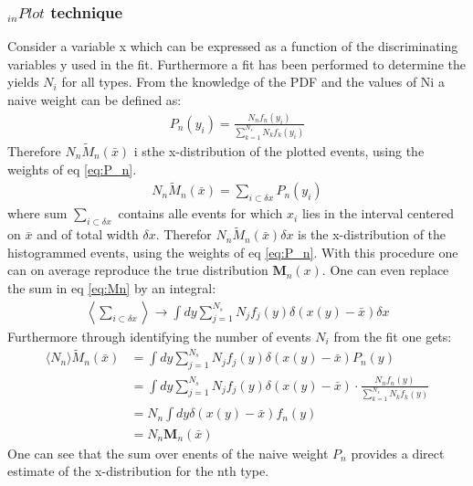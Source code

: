 \documentclass[english]{uzhpub}
\begin{document}
 \subsubsection{$_{in} Plot$ technique}
Consider a variable x which can be expressed as a function of the discriminating variables y used in the fit. Furthermore a fit has been performed to determine the yields $N_i$ for all types. From the knowledge of the PDF and the values of Ni a naive weight can be defined as:
 \begin{align}
  P_n(y_i) = \frac{N_n f_n(y_i)}{\sum_{k=1}^{N_s} N_k f_k(y_i)} \label{eq:P_n}
 \end{align}
 Therefore $N_n \tilde{M}_n (\bar{x})$ i sthe x-distribution of the plotted events, using the weights of eq \ref{eq:P_n}.
 \begin{align}
  N_n \tilde{M}_n (\bar{x}) = \sum_{i \subset \delta x} P_n (y_i) \label{eq:Mn}
 \end{align}
 where sum $\sum_{i \subset \delta x}$ contains alle events for which $x_i$ lies in the interval centered on $\bar{x}$ and of total width $\delta x$.
 Therefor $N_n \tilde{M}_n (\bar{x}) \delta x$ is the x-distribution of the histogrammed events, using the weights of eq \ref{eq:P_n}.
 With this procedure one can on average reproduce the true distribution $\textbf{M}_n(x)$. One can even replace the sum in eq \ref{eq:Mn} by an integral:
 \begin{align}
  \left \langle \sum_{i \subset \delta x} \right \rangle \rightarrow \int dy \sum_{j=1}^{N_s} N_j f_j (y) \delta (x(y) - \bar{x}) \delta x \label{eq:average}
 \end{align}
 Furthermore through identifying the number of events $N_i$ from the fit one gets:
 \begin{align}
  \langle N_n \rangle \tilde{M}_n (\bar{x}) & = \int dy \sum_{j=1}^{N_s} N_j f_j (y) \delta (x(y) - \bar{x}) P_n (y)                                               \\
                                            & = \int dy \sum_{j=1}^{N_s} N_j f_j (y) \delta (x(y)- \bar{x}) \cdot \frac{N_n f_n (y)}{\sum_{k=1}^{N_s} N_k f_k (y)} \\
                                            & = N_n \int dy \delta (x(y) - \bar{x}) f_n (y)                                                                        \\
                                            & = N_n \textbf{M}_n(\bar{x}) \label{eq:N_nM_n}
 \end{align}
 One can see that the sum over enents of the naive weight $P_n$ provides a direct estimate of the x-distribution for the nth type.
\end{document}
